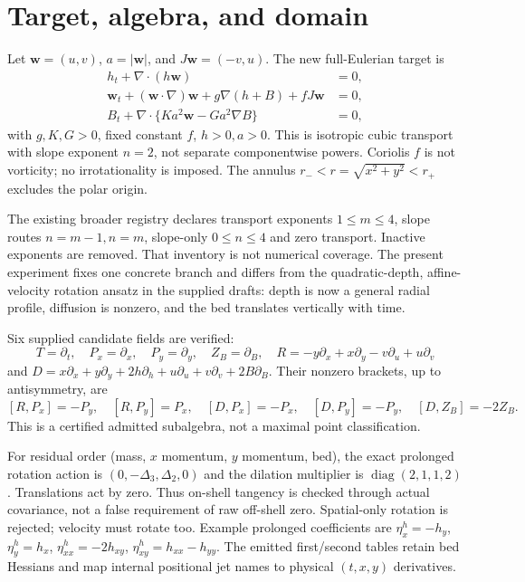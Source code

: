 \documentclass[11pt,a4paper,oneside]{report}
\numberwithin{equation}{chapter}
\begin{document}
\section{Target, algebra, and domain}\label{sec:2d}
Let $\mathbf w=(u,v)$, $a=|\mathbf w|$, and $J\mathbf w=(-v,u)$.
The new full-Eulerian target is
\begin{equation}\label{eq:2dsystem}
\begin{aligned}
h_t+\nabla\cdot(h\mathbf w)&=0,\\
\mathbf w_t+(\mathbf w\cdot\nabla)\mathbf w+
g\nabla(h+B)+fJ\mathbf w&=0,\\
B_t+\nabla\cdot\{Ka^2\mathbf w-Ga^2\nabla B\}&=0,
\end{aligned}
\end{equation}
with $g,K,G>0$, fixed constant $f$, $h>0,a>0$.
This is isotropic cubic transport with slope exponent $n=2$, not separate
componentwise powers. Coriolis $f$ is not vorticity; no irrotationality
is imposed. The annulus $r_-<r=\sqrt{x^2+y^2}<r_+$ excludes the polar origin.

The existing broader registry declares transport exponents $1\le m\le4$,
slope routes $n=m-1,n=m$, slope-only $0\le n\le4$ and zero transport.
Inactive exponents are removed. That inventory is not numerical coverage.
The present experiment fixes one concrete branch and differs from the
quadratic-depth, affine-velocity rotation ansatz in the supplied drafts:
depth is now a general radial profile, diffusion is nonzero, and the bed
translates vertically with time.

Six supplied candidate fields are verified:
\begin{equation}\label{eq:2d-basis}
T=\partial_t,\quad P_x=\partial_x,\quad P_y=\partial_y,\quad
Z_B=\partial_B,\quad
R=-y\partial_x+x\partial_y-v\partial_u+u\partial_v
\end{equation}
and
$D=x\partial_x+y\partial_y+2h\partial_h+u\partial_u+
v\partial_v+2B\partial_B$.
Their nonzero brackets, up to antisymmetry, are
\begin{equation}\label{eq:2d-brackets}
[R,P_x]=-P_y,\quad[R,P_y]=P_x,\quad
[D,P_x]=-P_x,\quad[D,P_y]=-P_y,\quad[D,Z_B]=-2Z_B.
\end{equation}
This is a certified admitted subalgebra, not a maximal point classification.

For residual order (mass, $x$ momentum, $y$ momentum, bed), the exact
prolonged rotation action is $(0,-\Delta_3,\Delta_2,0)$ and the dilation
multiplier is $\operatorname{diag}(2,1,1,2)$. Translations act by zero.
Thus on-shell tangency is checked through actual covariance, not a
false requirement of raw off-shell zero.
Spatial-only rotation is rejected; velocity must rotate too.
Example prolonged coefficients are $\eta^h_x=-h_y$,
$\eta^h_y=h_x$, $\eta^h_{xx}=-2h_{xy}$,
$\eta^h_{xy}=h_{xx}-h_{yy}$.
The emitted first/second tables retain bed Hessians and map internal
positional jet names to physical $(t,x,y)$ derivatives.
\end{document}
